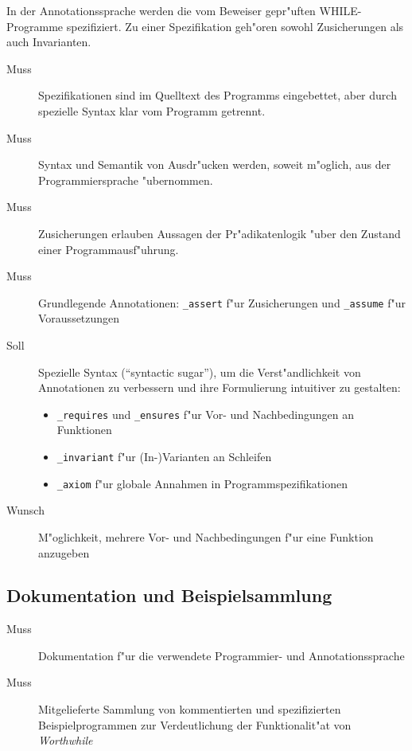 In der \see Annotationssprache werden die vom Beweiser gepr"uften WHILE-Programme spezifiziert. Zu einer Spezifikation geh"oren sowohl Zusicherungen als auch Invarianten.%

\begin{description}%
    \item [Muss] Spezifikationen sind im Quelltext des Programms eingebettet, aber durch spezielle Syntax klar vom Programm getrennt.%
    \item [Muss] Syntax und Semantik von Ausdr"ucken werden, soweit m"oglich, aus der Programmiersprache "ubernommen.%
    \item [Muss] Zusicherungen erlauben Aussagen der \see Pr"adikatenlogik "uber den Zustand einer Programmausf"uhrung.%
    \item [Muss] Grundlegende Annotationen: \texttt{\_assert} f"ur Zusicherungen und \texttt{\_assume} f"ur Voraussetzungen%
    \item [Soll] Spezielle Syntax ("`syntactic sugar"'), um die Verst"andlichkeit von Annotationen zu verbessern und ihre Formulierung intuitiver zu gestalten:%
        \begin{itemize}%
            \item \texttt{\_requires} und \texttt{\_ensures} f"ur \see Vor- und Nachbedingungen an Funktionen%
            \item \texttt{\_invariant} f"ur \see (In-)Varianten an Schleifen%
            \item \texttt{\_axiom} f"ur \see globale Annahmen in Programmspezifikationen%
        \end{itemize}%
    \item [Wunsch] M"oglichkeit, mehrere Vor- und Nachbedingungen f"ur eine Funktion anzugeben%
\end{description}%

\subsection{Dokumentation und Beispielsammlung}%

\begin{description}%
    \item [Muss] Dokumentation f"ur die verwendete Programmier- und Annotationssprache%
    \item [Muss] Mitgelieferte Sammlung von kommentierten und spezifizierten Beispielprogrammen zur Verdeutlichung der Funktionalit"at von \textit{Worthwhile}%
\end{description}%
